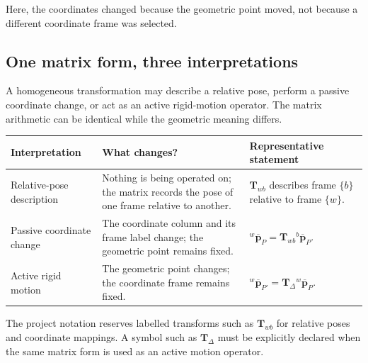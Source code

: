 \documentclass[
  australian,
  12pt,
  letterpaper,
  DIV=11,
  numbers=noendperiod,
  twoside]{scrreprt}
\newcounter{none} %
\begin{document}
Here, the coordinates changed because the geometric point moved, not
because a different coordinate frame was selected.

\subsection{One matrix form, three
interpretations}\label{one-matrix-form-three-interpretations}

A homogeneous transformation may describe a relative pose, perform a
passive coordinate change, or act as an active rigid-motion operator.
The matrix arithmetic can be identical while the geometric meaning
differs.

{\def\LTcaptype{none} %
\begin{longtable}[]{@{}
  >{\raggedright\arraybackslash}p{}
  >{\raggedright\arraybackslash}p{}
  >{\raggedright\arraybackslash}p{}@{}}
\toprule\noalign{}
\begin{minipage}[b]{\linewidth}\raggedright
Interpretation
\end{minipage} & \begin{minipage}[b]{\linewidth}\raggedright
What changes?
\end{minipage} & \begin{minipage}[b]{\linewidth}\raggedright
Representative statement
\end{minipage} \\
\midrule\noalign{}
\endhead
\bottomrule\noalign{}
\endlastfoot
Relative-pose description & Nothing is being operated on; the matrix
records the pose of one frame relative to another. & \(\mathbf T_{wb}\)
describes frame \(\{b\}\) relative to frame \(\{w\}\). \\
Passive coordinate change & The coordinate column and its frame label
change; the geometric point remains fixed. &
\({}^{w}\overline{\mathbf p}_P=\mathbf T_{wb}{}^{b}\overline{\mathbf p}_P\). \\
Active rigid motion & The geometric point changes; the coordinate frame
remains fixed. &
\({}^{w}\overline{\mathbf p}_{P'}=\mathbf T_{\Delta}{}^{w}\overline{\mathbf p}_P\). \\
\end{longtable}
}

The project notation reserves labelled transforms such as
\(\mathbf T_{wb}\) for relative poses and coordinate mappings. A symbol
such as \(\mathbf T_{\Delta}\) must be explicitly declared when the same
matrix form is used as an active motion operator.
\end{document}
